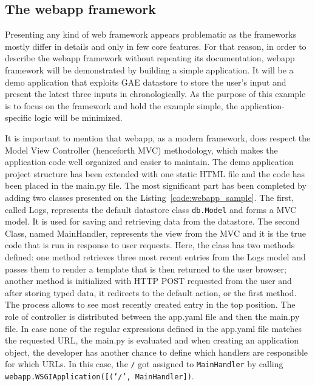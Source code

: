 \subsection{The webapp framework}\label{subsec:webapp}
Presenting any kind of web framework appears problematic as the frameworks mostly differ in details and only in few core features. For that reason, in order to describe the webapp framework without repeating its documentation, webapp framework will be demonstrated by building a simple application. It will be a demo application that exploits GAE datastore to store the user's input and present the latest three inputs in chronologically. As the purpose of this example is to focus on the framework and hold the example simple, the application-specific logic will be minimized.

It is important to mention that webapp, as a modern framework, does respect the Model View Controller (henceforth MVC) methodology, which makes the application code well organized and easier to maintain. The demo application project structure has been extended with one static HTML file and the code has been placed in the main.py file. The most significant part has been completed by adding two classes presented on the Listing~\ref{code:webapp_sample}. The first, called Logs, represents the default datastore class \texttt{db.Model} and forms a MVC model. It is used for saving and retrieving data from the datastore. The second Class, named MainHandler, represents the view from the MVC and it is the true code that is run in response to user requests. Here, the class has two methods defined: one method retrieves three most recent entries from the Logs model and passes them to render a template that is then returned to the user browser; another method is initialized with HTTP POST requested from the user and after storing typed data, it redirects to the default action, or the first method. The process allows to see most recently created entry in the top position. The role of controller is distributed between the app.yaml file and then the main.py file. In case none of the regular expressions defined in the app.yaml file matches the requested URL, the main.py is evaluated and when creating an application object, the developer has another chance to define which handlers are responsible for which URLs. In this case, the \texttt{/} got assigned to \texttt{MainHandler} by calling \texttt{webapp.WSGIApplication([('/', MainHandler])}.
\newpage
{}



